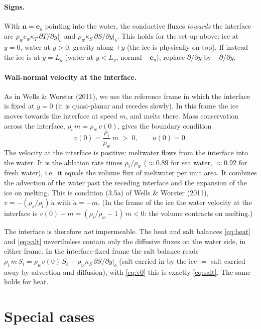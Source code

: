 \documentclass[11pt,a4paper]{article}
\begin{document}
\paragraph{Signs.} With $\mathbf{n}=\mathbf{e}_y$ pointing into the water, the conductive fluxes
\emph{towards} the interface are $\rho_w c_w \kappa_T\, \partial T/\partial y|_b$ and
$\rho_w \kappa_S\, \partial S/\partial y|_b$. This holds for the set-up above: ice at $y=0$, water at
$y>0$, gravity along $+y$ (the ice is physically on top). If instead the ice is at $y=L_y$ (water at
$y<L_y$, normal $-\mathbf{e}_y$), replace $\partial/\partial y$ by $-\partial/\partial y$.

\paragraph{Wall-normal velocity at the interface.} As in Wells \& Worster (2011), we use the
reference frame in which the interface is fixed at $y=0$ (it is quasi-planar and recedes slowly). In
this frame the ice moves towards the interface at speed $m$, and melts there. Mass conservation across
the interface, $\rho_i\, m = \rho_w\, v(0)$, gives the boundary condition
\begin{equation}
  v(0) = \frac{\rho_i}{\rho_w}\, m \;>\; 0 , \qquad u(0) = 0 . \label{eq:v0}
\end{equation}
The velocity at the interface is positive: meltwater flows from the interface into the water. It is
the ablation rate times $\rho_i/\rho_w$ ($\approx 0.89$ for sea water, $\approx 0.92$ for fresh
water), i.e.\ it equals the volume flux of meltwater per unit area. It combines the advection of the
water past the receding interface and the expansion of the ice on melting. This is condition (3.5a)
of Wells \& Worster (2011), $v=-(\rho_s/\rho_l)\,\dot a$ with $\dot a=-m$. (In the frame of the ice
the water velocity at the interface is $v(0)-m = (\rho_i/\rho_w-1)\,m<0$: the volume contracts on
melting.)

The interface is therefore \emph{not} impermeable. The heat and salt balances \eqref{eq:heat} and
\eqref{eq:salt} nevertheless contain only the diffusive fluxes on the water side, in either frame. In
the interface-fixed frame the salt balance reads
$\rho_i\, m\, S_i = \rho_w v(0)\, S_b - \rho_w \kappa_S\, \partial S/\partial y|_b$ (salt carried in by
the ice $=$ salt carried away by advection and diffusion); with \eqref{eq:v0} this is exactly
\eqref{eq:salt}. The same holds for heat.

\section{Special cases}
\end{document}
